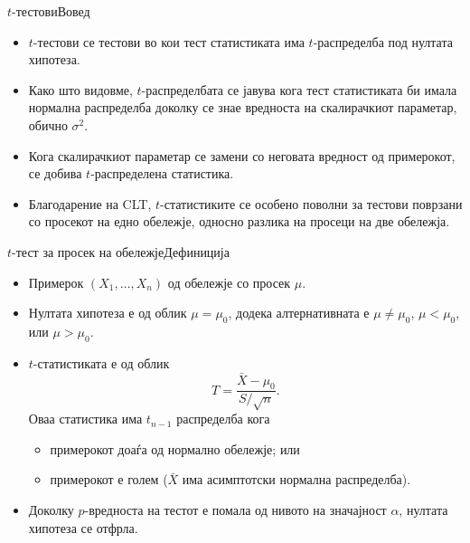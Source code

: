 \documentclass[hyperref={unicode}, xcolor={svgnames, table},
usepdftitle=false]{beamer}
\theoremstyle{remark}
\begin{document}
\begin{frame}{\(t\)-тестови}{Вовед}
  \begin{itemize}
  \item \(t\)-тестови се тестови во кои тест статистиката има \(t\)-распределба
    под нултата хипотеза.
  \item Како што видовме, \(t\)-распределбата се јавува кога тест статистиката
    би имала нормална распределба доколку се знае вредноста на скалирачкиот
    параметар, обично \(\sigma^2\).
  \item Кога скалирачкиот параметар се замени со неговата вредност од
    примерокот, се добива \(t\)-распределена статистика.
  \item Благодарение на CLT, \(t\)-статистиките се особено поволни за тестови
    поврзани со просекот на едно обележје, односно разлика на просеци на две
    обележја.
  \end{itemize}
\end{frame}

\begin{frame}{\(t\)-тест за просек на обележје}{Дефиниција}
  \begin{itemize}
  \item Примерок \((X_1, \ldots, X_n)\) од обележје со просек \(\mu\).
  \item Нултата хипотеза е од облик \(\mu = \mu_0\), додека алтернативната е
    \(\mu \ne \mu_0\), \(\mu < \mu_0\), или \(\mu > \mu_0\).
  \item \(t\)-статистиката е од облик
    \[
      T = \frac{\bar{X} - \mu_0}{S / {\sqrt{n}}}\text{.}
    \]
    Оваа статистика има \(t_{n - 1}\) распределба кога
    \begin{itemize}
    \item примерокот доаѓа од нормално обележје; или
    \item примерокот е голем (\(\bar{X}\) има асимптотски нормална распределба).
    \end{itemize}
  \item Доколку \(p\)-вредноста на тестот е помала од нивото на значајност
    \(\alpha\), нултата хипотеза се отфрла.
  \end{itemize}
\end{frame}

\end{document}
